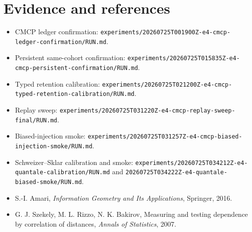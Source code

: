 \documentclass[11pt]{article}
\begin{document}
\section{Evidence and references}
\begin{itemize}
\item CMCP ledger confirmation: \texttt{experiments/20260725T001900Z-e4-cmcp-ledger-confirmation/RUN.md}.
\item Persistent same-cohort confirmation: \texttt{experiments/20260725T015835Z-e4-cmcp-persistent-confirmation/RUN.md}.
\item Typed retention calibration: \texttt{experiments/20260725T021200Z-e4-cmcp-typed-retention-calibration/RUN.md}.
\item Replay sweep: \texttt{experiments/20260725T031220Z-e4-cmcp-replay-sweep-final/RUN.md}.
\item Biased-injection smoke: \texttt{experiments/20260725T031257Z-e4-cmcp-biased-injection-smoke/RUN.md}.
\item Schweizer--Sklar calibration and smoke: \texttt{experiments/20260725T034212Z-e4-quantale-calibration/RUN.md} and \texttt{20260725T034222Z-e4-quantale-biased-smoke/RUN.md}.
\item S.-I. Amari, \emph{Information Geometry and Its Applications}, Springer, 2016.
\item G. J. Szekely, M. L. Rizzo, N. K. Bakirov, Measuring and testing dependence by correlation of distances, \emph{Annals of Statistics}, 2007.
\end{itemize}
\end{document}
